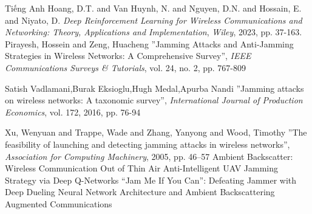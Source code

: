 \documentclass{uetgraduation}
\begin{document}
\begin{thebibliography}{9}
\begin{bibsection}{Tiếng Anh}
    Hoang, D.T. and Van Huynh, N. and Nguyen, D.N. and Hossain, E. and Niyato, D.
    \textit{Deep Reinforcement Learning for Wireless Communications and Networking: Theory, Applications and Implementation},
    \textit{Wiley}, 2023, pp. 37-163.
    Pirayesh, Hossein and Zeng, Huacheng
    ''Jamming Attacks and Anti-Jamming Strategies in Wireless Networks: A Comprehensive Survey'',
    \textit{IEEE Communications Surveys \& Tutorials},
    vol. 24, no. 2,
    pp. 767-809

    Satish Vadlamani,Burak Eksioglu,Hugh Medal,Apurba Nandi
    ''Jamming attacks on wireless networks: A taxonomic survey'',
    \textit{International Journal of Production Economics},
    vol. 172,
    2016,
    pp. 76-94

    Xu, Wenyuan and Trappe, Wade and Zhang, Yanyong and Wood, Timothy
    ''The feasibility of launching and detecting jamming attacks in wireless networks'',
    \textit{Association for Computing Machinery},
    2005,
    pp. 46–57
    Ambient Backscatter: Wireless Communication Out of Thin Air
    Anti-Intelligent UAV Jamming Strategy via Deep Q-Networks
    “Jam Me If You Can”: Defeating Jammer with Deep Dueling Neural Network Architecture and Ambient Backscattering Augmented Communications
\end{bibsection}
\end{thebibliography}
\end{document}
